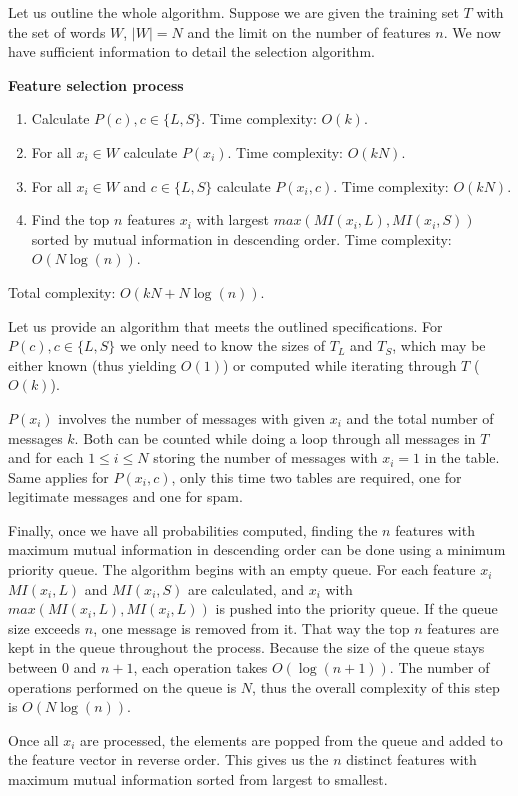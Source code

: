 \documentclass[12pt]{report}
\begin{document}
Let us outline the whole algorithm. Suppose we are given the training set $T$ with the set of words $W$, $|W| = N$ and the limit on the number of features $n$. We now have sufficient information to detail the selection algorithm.

\textbf{Feature selection process}

\begin{enumerate}
	\item Calculate $P(c), c \in \{L, S\}$. Time complexity: $O(k)$.
	\item For all $x_i \in W$ calculate $P(x_i)$. Time complexity: $O(kN)$.
	\item For all $x_i \in W$ and $c \in \{L, S\}$ calculate $P(x_i, c)$. Time complexity: $O(kN)$.
	\item Find the top $n$ features $x_i$ with largest $max(MI(x_i, L), MI(x_i, S))$ sorted by mutual information in descending order. Time complexity: $O(N \log(n))$.
\end{enumerate}

Total complexity: $O(kN + N \log(n))$.

Let us provide an algorithm that meets the outlined specifications. For $P(c), c \in \{L, S\}$ we only need to know the sizes of $T_L$ and $T_S$, which may be either known (thus yielding $O(1)$) or computed while iterating through $T$ ($O(k)$).

$P(x_i)$ involves the number of messages with given $x_i$ and the total number of messages $k$. Both can be counted while doing a loop through all messages in $T$ and for each $1 \le i \le N$ storing the number of messages with $x_i = 1$ in the table. Same applies for $P(x_i, c)$, only this time two tables are required, one for legitimate messages and one for spam.

Finally, once we have all probabilities computed, finding the $n$ features with maximum mutual information in descending order can be done using a minimum priority queue. The algorithm begins with an empty queue. For each feature $x_i$ $MI(x_i, L)$ and $MI(x_i, S)$ are calculated, and $x_i$ with $max(MI(x_i, L), MI(x_i, L))$ is pushed into the priority queue. If the queue size exceeds $n$, one message is removed from it. That way the top $n$ features are kept in the queue throughout the process. Because the size of the queue stays between $0$ and $n + 1$, each operation takes $O(\log(n + 1))$. The number of operations performed on the queue is $N$, thus the overall complexity of this step is $O(N \log(n))$.

Once all $x_i$ are processed, the elements are popped from the queue and added to the feature vector in reverse order. This gives us the $n$ distinct features with maximum mutual information sorted from largest to smallest.
\end{document}
